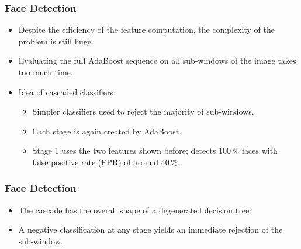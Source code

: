 \begin{frame}
  \frametitle{Face Detection \cont}


  \begin{itemize}
    \item Despite the efficiency of the feature computation, the complexity of the problem is still huge. %
    \item Evaluating the full AdaBoost sequence on all sub-windows of the image takes too much time.
    \pspread
    \item Idea of cascaded classifiers:
    \begin{itemize}
      \item Simpler classifiers used to reject the majority of sub-windows. %
      \item Each stage is again created by AdaBoost. %
      \item Stage 1 uses the two features shown before; detects 100\,\% faces with \\ false positive rate (FPR) of around 40\,\%.
    \end{itemize}
  \end{itemize}
\end{frame}


\begin{frame}
  \frametitle{Face Detection \cont}

  \begin{itemize}
    \item The cascade has the overall shape of a degenerated decision tree: \\[.5cm]
      \begin{center}
        \resizebox{.7\linewidth}{!}{
          
        }
      \end{center}
      \pspread
    \item A negative classification at any stage yields an immediate rejection of the sub-window.
  \end{itemize}
\end{frame}


